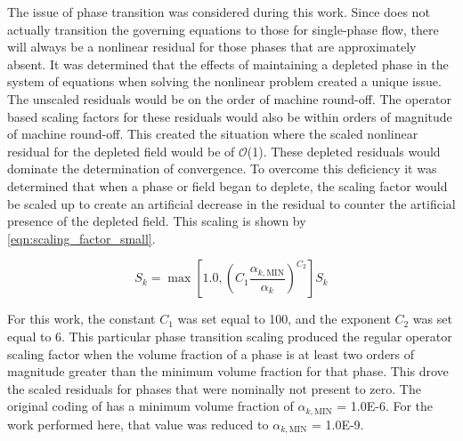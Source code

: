 The issue of phase transition was considered during this work.
Since \cobra{} does not actually transition the governing equations to those for single-phase flow, there will always be a nonlinear residual for those phases that are approximately absent.
It was determined that the effects of maintaining a depleted phase in the system of equations when solving the nonlinear problem created a unique issue.
The unscaled residuals would be on the order of machine round-off.
The operator based scaling factors for these residuals would also be within orders of magnitude of machine round-off.
This created the situation where the scaled nonlinear residual for the depleted field would be of $\mathcal{O}$(1).
These depleted residuals would dominate the determination of convergence.
To overcome this deficiency it was determined that when a phase or field began to deplete, the scaling factor would be scaled up to create an artificial decrease in the residual to counter the artificial presence of the depleted field.
This scaling is shown by \eqref{eqn:scaling_factor_small}.

\begin{equation}
\label{eqn:scaling_factor_small}
S_k = \max[1.0, \left(C_1 \frac{\alpha_{k,\text{MIN}}}{\alpha_k}\right)^{C_2} ] S_k
\end{equation}

For this work, the constant $C_1$ was set equal to 100, and the exponent $C_2$ was set equal to 6.
This particular phase transition scaling produced the regular operator scaling factor when the volume fraction of a phase is at least two orders of magnitude greater than the minimum volume fraction for that phase.
This drove the scaled residuals for phases that were nominally not present to zero.
The original coding of \cobra{} has a minimum volume fraction of $\alpha_{k,\text{MIN}}$ = 1.0E-6.
For the work performed here, that value was reduced to $\alpha_{k,\text{MIN}}$ = 1.0E-9.

